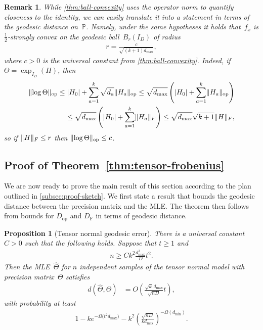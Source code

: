 \documentclass[aos]{imsart}
\newtheorem{prop}[theorem]{Proposition}
\newtheorem{remark}[theorem]{Remark}
\theoremstyle{definition}
\numberwithin{equation}{section}
\DeclareMathOperator{\op}{op}
\DeclarePairedDelimiter{\abs}{\lvert}{\rvert}
\DeclarePairedDelimiter{\norm}{\lVert}{\rVert}
\renewcommand{\P}{{\mathbb{P}}}
\newcommand{\htheta}{\widehat{\Theta}}
\newcommand{\DF}{D_{\operatorname{F}}}
\newcommand{\Dop}{D_{\operatorname{op}}}
\def\dmin{d_{\min}}
\def\dmax{d_{\max}}
\newcommand{\MW}[1]{{\color{red}[MW: #1]}}
\newcommand{\MW}[1]{{}}
\begin{document}
\begin{remark}\label{remark-strong-convexity-balls}
While \cref{thm:ball-convexity} uses the operator norm to quantify closeness to the identity, we can easily translate it into a statement in terms of the geodesic distance on~$\P$.
Namely, under the same hypotheses it holds that~$f_x$ is $\frac12$-strongly convex on the geodesic ball~$B_r(I_D)$ of radius
\begin{align*}
  r= \frac c{\sqrt{(k+1)\dmax}},
\end{align*}
where $c>0$ is the universal constant from \cref{thm:ball-convexity}.
Indeed, if $\Theta = \exp_{I_D}(H)$, then
\begin{align*}
  \norm{\log\Theta}_{\op}
\leq \abs{H_0} + \sum_{a=1}^k \sqrt{d_a} \norm{H_a}_{\op}
\leq \sqrt{\dmax} \left( \abs{H_0} + \sum_{a=1}^k \norm{H_a}_{\op} \right) \\
\leq \sqrt{\dmax} \left( \abs{H_0} + \sum_{a=1}^k \norm{H_a}_F \right)
\leq \sqrt{\dmax} \sqrt{k+1} \norm{H}_F,
\end{align*}
so if $\norm{H}_F \leq r$ then $\norm{\log\Theta}_{\op} \leq c$.
\end{remark}

\subsection{Proof of Theorem~\ref{thm:tensor-frobenius}}
We are now ready to prove the main result of this section according to the plan outlined in \cref{subsec:proof-sketch}.
We first state a result that bounds the geodesic distance between the precision matrix and the MLE.
The theorem then follows from bounds for $\Dop$ and $\DF$ in terms of geodesic distance.

\begin{prop}[Tensor normal geodesic error]\label{lem:tensor-geodesic}
There is a universal constant~$C>0$ such that the following holds.
Suppose that $t \geq 1$ and
\begin{align}\label{eq:proposition eps sqr assm}
  n \geq C k^2 \frac{\dmax^3}D t^2.
\end{align}
Then the MLE~$\htheta$ for $n$ independent samples of the tensor normal model with precision matrix~$\Theta$ satisfies
\begin{align*}
  d(\htheta,\Theta) &= O\left(\frac{\sqrt{k} \, \dmax }{\sqrt{nD}} t\right),
\end{align*}
with probability at least
\begin{align*}
  1 - k e^{-\Omega\bigl( t^2 \dmax \bigr)} - k^2 \left( \frac{\sqrt{nD}}{k \dmax} \right)^{-\Omega(\dmin)}.
\end{align*}
\end{prop}
\end{document}

